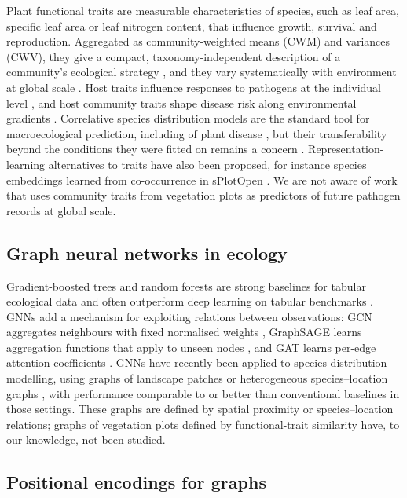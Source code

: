 \documentclass[a4paper,fleqn]{cas-sc}
\begin{document}
Plant functional traits are measurable characteristics of species, such as leaf area, specific leaf area or leaf nitrogen content, that influence growth, survival and reproduction. Aggregated as community-weighted means (CWM) and variances (CWV), they give a compact, taxonomy-independent description of a community's ecological strategy \citep{lavorel2002}, and they vary systematically with environment at global scale \citep{bruelheide2018}. Host traits influence responses to pathogens at the individual level \citep{jin2021}, and host community traits shape disease risk along environmental gradients \citep{halliday2021}. Correlative species distribution models are the standard tool for macroecological prediction, including of plant disease \citep{elith2009}, but their transferability beyond the conditions they were fitted on remains a concern \citep{guillera2015}. Representation-learning alternatives to traits have also been proposed, for instance species embeddings learned from co-occurrence in sPlotOpen \citep{siefert2024}. We are not aware of work that uses community traits from vegetation plots as predictors of future pathogen records at global scale.

\subsection{Graph neural networks in ecology}

Gradient-boosted trees and random forests are strong baselines for tabular ecological data \citep{valavi2022} and often outperform deep learning on tabular benchmarks \citep{grinsztajn2022}. GNNs add a mechanism for exploiting relations between observations: GCN aggregates neighbours with fixed normalised weights \citep{kipf2017}, GraphSAGE learns aggregation functions that apply to unseen nodes \citep{hamilton2017}, and GAT learns per-edge attention coefficients \citep{velickovic2018}. GNNs have recently been applied to species distribution modelling, using graphs of landscape patches \citep{wu2025} or heterogeneous species--location graphs \citep{harrell2025}, with performance comparable to or better than conventional baselines in those settings. These graphs are defined by spatial proximity or species--location relations; graphs of vegetation plots defined by functional-trait similarity have, to our knowledge, not been studied.

\subsection{Positional encodings for graphs}
\end{document}
